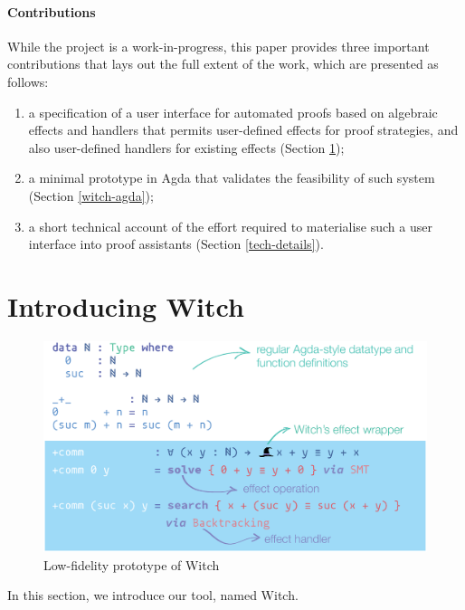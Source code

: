 \documentclass[acmsmall]{acmart}
\begin{document}
\paragraph{Contributions} While the project is a work-in-progress, this paper
provides three important contributions that lays out the full extent of the
work, which are presented as follows:
\begin{enumerate}
\item a specification of a user interface for automated proofs based on
  algebraic effects and handlers that permits user-defined effects for proof
  strategies, and also user-defined handlers for existing effects (Section \ref{intro-witch});
\item a minimal prototype in Agda that validates the feasibility of such system
  (Section \ref{witch-agda});
\item a short technical account of the effort required to materialise such a
  user interface into proof assistants (Section \ref{tech-details}).
\end{enumerate}

\section{Introducing Witch} \label{intro-witch}

\begin{figure}[!ht]
   \centering
    \includegraphics[width=\textwidth]{image/witch.eps}
    \caption{Low-fidelity prototype of Witch}
    \label{fig:prototype}
\end{figure}

In this section, we introduce our tool, named Witch.
\end{document}
